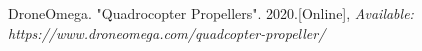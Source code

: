 \begin{spacing}{2}
\renewcommand\bibname{References}
\begin{thebibliography}{1}
	\vspace{1cm}
	
	DroneOmega. "Quadrocopter Propellers". 2020.[Online],	
	\textit{Available: https://www.droneomega.com/quadcopter-propeller/}


\end{thebibliography}
\end{spacing}
